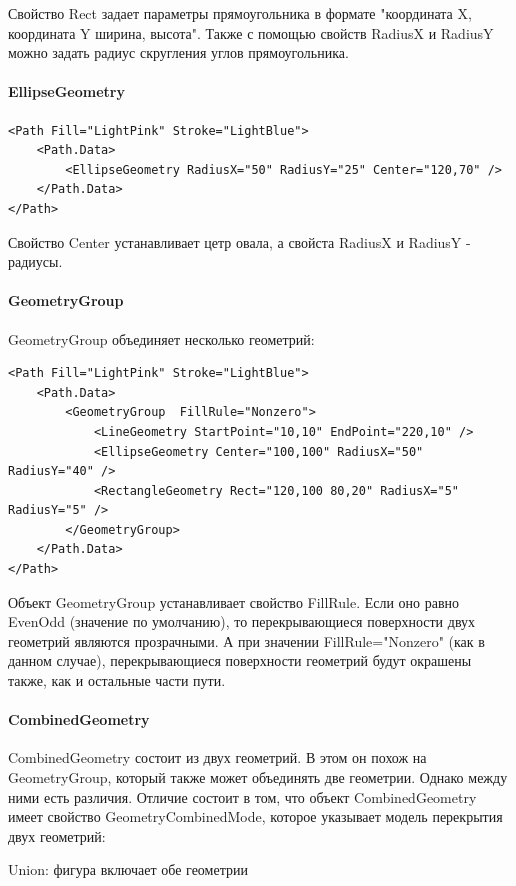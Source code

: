 Свойство Rect задает параметры прямоугольника в формате "координата X, координата Y ширина, высота". Также с помощью свойств RadiusX и RadiusY можно задать радиус скругления углов прямоугольника.

\paragraph{EllipseGeometry}

\begin{verbatim}
<Path Fill="LightPink" Stroke="LightBlue">
    <Path.Data>
        <EllipseGeometry RadiusX="50" RadiusY="25" Center="120,70" />
    </Path.Data>
</Path>
\end{verbatim}

Свойство Center устанавливает цетр овала, а свойста RadiusX и RadiusY - радиусы.

\paragraph{GeometryGroup}
GeometryGroup объединяет несколько геометрий:

\begin{verbatim}
<Path Fill="LightPink" Stroke="LightBlue">
    <Path.Data>
        <GeometryGroup  FillRule="Nonzero">
            <LineGeometry StartPoint="10,10" EndPoint="220,10" />
            <EllipseGeometry Center="100,100" RadiusX="50" RadiusY="40" />
            <RectangleGeometry Rect="120,100 80,20" RadiusX="5" RadiusY="5" />
        </GeometryGroup>
    </Path.Data>
</Path>
\end{verbatim}

Объект GeometryGroup устанавливает свойство FillRule. Если оно равно EvenOdd (значение по умолчанию), то перекрывающиеся поверхности двух геометрий являются прозрачными. А при значении FillRule="Nonzero" (как в данном случае), перекрывающиеся поверхности геометрий будут окрашены также, как и остальные части пути.

\paragraph{CombinedGeometry}
CombinedGeometry состоит из двух геометрий. В этом он похож на GeometryGroup, который также может объединять две геометрии. Однако между ними есть различия. Отличие состоит в том, что объект CombinedGeometry имеет свойство GeometryCombinedMode, которое указывает модель перекрытия двух геометрий:

Union: фигура включает обе геометрии

